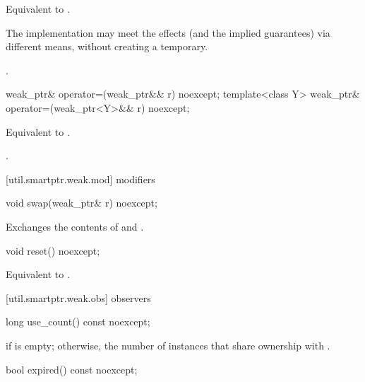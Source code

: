\begin{itemdescr}
\pnum\effects  Equivalent to .

\pnum\remarks  The implementation may meet the effects (and the
implied guarantees) via different means, without creating a temporary.

\pnum\returns  {}.
\end{itemdescr}

%
\begin{itemdecl}
weak_ptr& operator=(weak_ptr&& r) noexcept;
template<class Y> weak_ptr& operator=(weak_ptr<Y>&& r) noexcept;
\end{itemdecl}

\begin{itemdescr}
\pnum\effects  Equivalent to .

\pnum\returns  {}.
\end{itemdescr}

[util.smartptr.weak.mod]{ modifiers}
%
\begin{itemdecl}
void swap(weak_ptr& r) noexcept;
\end{itemdecl}

\begin{itemdescr}
\pnum\effects  Exchanges the contents of  and .
\end{itemdescr}

%
\begin{itemdecl}
void reset() noexcept;
\end{itemdecl}

\begin{itemdescr}
\pnum\effects  Equivalent to .
\end{itemdescr}

[util.smartptr.weak.obs]{ observers}
%
\begin{itemdecl}
long use_count() const noexcept;
\end{itemdecl}

\begin{itemdescr}
\pnum\returns  {} if  is empty;
otherwise, the number of  instances
that share ownership with .
\end{itemdescr}

%
\begin{itemdecl}
bool expired() const noexcept;
\end{itemdecl}

